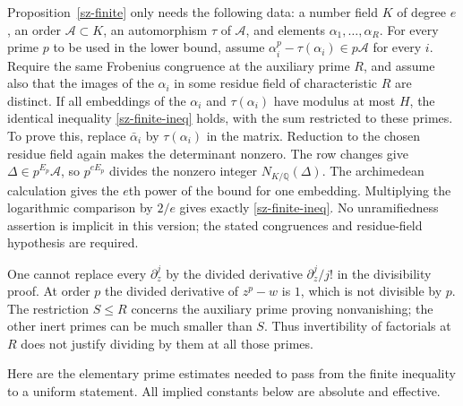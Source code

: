 \begin{remark}
Proposition~\ref{sz-finite} only needs the following data: a number field
$K$ of degree $e$, an order $\mathcal A\subset K$, an automorphism
$\tau$ of $\mathcal A$, and elements $\alpha_1,\ldots,\alpha_R$.
For every prime $p$ to be used in the lower bound, assume
$\alpha_i^p-\tau(\alpha_i)\in p\mathcal A$ for every $i$.
Require the same Frobenius congruence at the auxiliary prime $R$,
and assume also that the images of the
$\alpha_i$ in some residue field of characteristic $R$ are distinct.
If all embeddings of the $\alpha_i$ and $\tau(\alpha_i)$ have modulus
at most $H$, the identical inequality \eqref{sz-finite-ineq} holds, with
the sum restricted to these primes. To prove this, replace
$\bar\alpha_i$ by $\tau(\alpha_i)$ in the matrix. Reduction to the
chosen residue field again makes the determinant nonzero. The row changes
give $\Delta\in p^{E_p}\mathcal A$, so
$p^{eE_p}$ divides the nonzero integer $N_{K/\mathbb Q}(\Delta)$.
The archimedean calculation gives the $e$th power of the bound for one
embedding. Multiplying the logarithmic comparison by $2/e$ gives exactly
\eqref{sz-finite-ineq}. No unramifiedness assertion is implicit in this
version; the stated congruences and residue-field hypothesis are required.
\end{remark}

\begin{remark}
One cannot replace every $\partial_z^j$ by the divided derivative
$\partial_z^j/j!$ in the divisibility proof. At order $p$ the divided
derivative of $z^p-w$ is $1$, which is not divisible by $p$.
The restriction $S\le R$ concerns the auxiliary prime proving nonvanishing;
the other inert primes can be much smaller than $S$. Thus invertibility
of factorials at $R$ does not justify dividing by them at all those primes.
\end{remark}

Here are the elementary prime estimates needed to pass from the finite
inequality to a uniform statement. All implied constants below are absolute
and effective.

